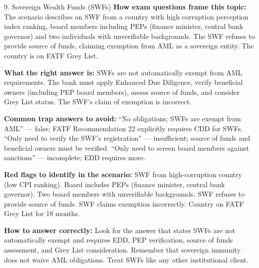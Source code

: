 \documentclass[11pt,a4paper]{beamer}
\begin{document}
	\begin{frame}{9. Sovereign Wealth Funds (SWFs)}
		\tiny
		\noindent\textbf{How exam questions frame this topic:} The scenario describes an SWF from a country with high corruption perception index ranking, board members including PEPs (finance minister, central bank governor) and two individuals with unverifiable backgrounds. The SWF refuses to provide source of funds, claiming exemption from AML as a sovereign entity. The country is on FATF Grey List.
		
		\vspace{0.1cm}
		\noindent\textbf{What the right answer is:} SWFs are not automatically exempt from AML requirements. The bank must apply Enhanced Due Diligence, verify beneficial owners (including PEP board members), assess source of funds, and consider Grey List status. The SWF's claim of exemption is incorrect.
		
		\vspace{0.1cm}
		\noindent\textbf{Common trap answers to avoid:} “No obligations; SWFs are exempt from AML” — false; FATF Recommendation 22 explicitly requires CDD for SWFs. “Only need to verify the SWF's registration” — insufficient; source of funds and beneficial owners must be verified. “Only need to screen board members against sanctions” — incomplete; EDD requires more.
		
		\vspace{0.1cm}
		\noindent\textbf{Red flags to identify in the scenario:} SWF from high-corruption country (low CPI ranking). Board includes PEPs (finance minister, central bank governor). Two board members with unverifiable backgrounds. SWF refuses to provide source of funds. SWF claims exemption incorrectly. Country on FATF Grey List for 18 months.
		
		\vspace{0.1cm}
		\noindent\textbf{How to answer correctly:} Look for the answer that states SWFs are not automatically exempt and requires EDD, PEP verification, source of funds assessment, and Grey List consideration. Remember that sovereign immunity does not waive AML obligations. Treat SWFs like any other institutional client.
	\end{frame}
	
\end{document}
